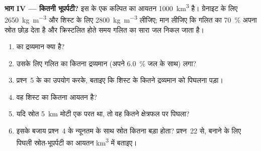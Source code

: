 \begin{problem}[{सप्ताहांत समस्या --- पिघले अभ्रक से एक प्लूटॉन}]
\noindent\textbf{भाग IV --- कितनी भूपर्पटी?}
इस  के एक कल्पित  का आयतन \qty{1000}{\cubic\kilo\metre} है।
ग्रेनाइट के लिए \qty{2650}{\kilogram\per\cubic\metre} और
शिस्ट के लिए \qty{2800}{\kilogram\per\cubic\metre} लीजिए; मान लीजिए कि गलित का \qty{70}{\percent}
अपना स्रोत छोड़ देता है और क्रिस्टलित होते समय गलित का सारा जल निकल जाता है।
\begin{enumerate}[resume]
\item {} का द्रव्यमान क्या है?
\item उसके लिए गलित का कितना द्रव्यमान (अपने \qty{6.0}{\percent} जल के साथ) लगा?
\item प्रश्न~5 के  का उपयोग करके, बताइए कि शिस्ट के कितने द्रव्यमान को पिघलना पड़ा।
\item वह शिस्ट का कितना आयतन है?
\item यदि स्रोत \qty{5}{km} मोटी एक परत था, तो वह कितने क्षेत्रफल पर पिघला?
\item इसके बजाय प्रश्न~4 के न्यूनतम  के साथ स्रोत कितना बड़ा होता?
प्रश्न~22 से,  बनाने के लिए पिघली स्रोत-भूपर्पटी का आयतन
\unit{\cubic\kilo\metre} में बताइए।
\end{enumerate}
\end{problem}
